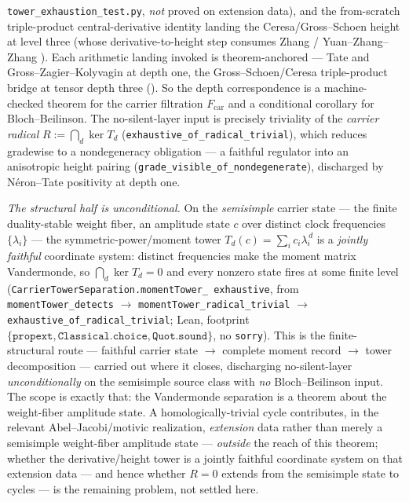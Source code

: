 \documentclass[11pt]{article}
\theoremstyle{definition}
\begin{document}
\texttt{tower\_exhaustion\_test.py}, \emph{not} proved on extension data), and the from-scratch triple-product
central-derivative identity landing the Ceresa/Gross--Schoen height at level three (whose
derivative-to-height step consumes Zhang \cite{ZhangGS} / Yuan--Zhang--Zhang \cite{YZZ}). Each
arithmetic landing invoked is theorem-anchored --- Tate and Gross--Zagier--Kolyvagin at depth one,
the Gross--Schoen/Ceresa triple-product bridge at tensor depth three (\cite{ZhangGS,YZZ}). So the
depth correspondence is a machine-checked theorem for the carrier filtration $F_{\mathrm{car}}$ and a
conditional corollary for Bloch--Beilinson. The no-silent-layer input is precisely triviality of the
\emph{carrier radical} $R:=\bigcap_d\ker T_d$ (\texttt{exhaustive\_of\_radical\_trivial}), which
reduces gradewise to a nondegeneracy obligation --- a faithful regulator into an anisotropic height
pairing (\texttt{grade\_visible\_of\_nondegenerate}), discharged by N\'eron--Tate positivity at depth
one.

\emph{The structural half is unconditional.} On the \emph{semisimple} carrier state --- the finite
duality-stable weight fiber, an amplitude state $c$ over distinct clock frequencies $\{\lambda_i\}$ ---
the symmetric-power/moment tower $T_d(c)=\sum_i c_i\lambda_i^{\,d}$ is a \emph{jointly faithful}
coordinate system: distinct frequencies make the moment matrix Vandermonde, so $\bigcap_d\ker T_d=0$
and every nonzero state fires at some finite level (\texttt{CarrierTowerSeparation.momentTower\_%
exhaustive}, from \texttt{momentTower\_detects} $\to$ \texttt{momentTower\_radical\_trivial} $\to$
\texttt{exhaustive\_of\_radical\_trivial}; Lean, footprint
$\{\texttt{propext},\texttt{Classical.choice},\texttt{Quot.sound}\}$, no \texttt{sorry}).
This is the finite-structural route --- faithful carrier state $\to$ complete moment record $\to$ tower
decomposition --- carried out where it closes, discharging no-silent-layer \emph{unconditionally} on the
semisimple source class with \emph{no} Bloch--Beilinson input. The scope is exactly that: the Vandermonde
separation is a theorem about the weight-fiber amplitude state. A homologically-trivial cycle contributes,
in the relevant Abel--Jacobi/motivic realization, \emph{extension} data rather than merely a semisimple
weight-fiber amplitude state --- \emph{outside} the reach of this theorem; whether the derivative/height
tower is a jointly faithful coordinate system on that extension data --- and hence whether $R=0$ extends
from the semisimple state to cycles --- is the remaining problem, not settled here.
\end{document}

